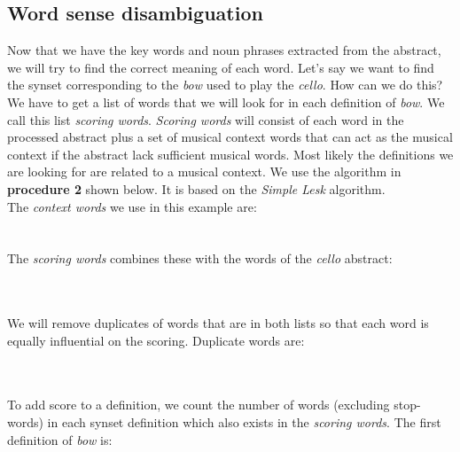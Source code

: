 
\subsection{Word sense disambiguation}
Now that we have the key words and noun phrases extracted from the abstract, we will try to find the correct meaning of each word. Let's say we want to find the synset corresponding to the \emph{bow} used to play the \emph{cello}. How can we do this? We have to get a list of words that we will look for in each definition of \emph{bow}. We call this list \emph{scoring words}. \emph{Scoring words} will consist of each word in the processed abstract plus a set of musical context words that can act as the musical context if the abstract lack sufficient musical words. Most likely the definitions we are looking for are related to a musical context. We use the algorithm in \textbf{procedure 2} shown below. It is based on the \emph{Simple Lesk} algorithm.
\\The \emph{context words} we use in this example are:\\
\noindent{}
\\\\The \emph{scoring words} combines these with the words of the \emph{cello} abstract:

\noindent{}
\\\\We will remove duplicates of words that are in both lists so that each word is equally influential on the scoring. Duplicate words are:

\noindent{}
\\\\To add score to a definition, we count the number of words (excluding stop-words) in each synset definition which also exists in the \emph{scoring words}. The first definition of \emph{bow} is:

